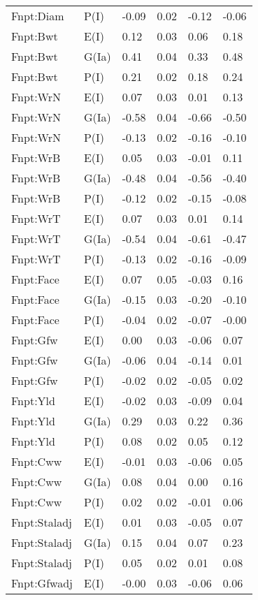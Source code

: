 \begin{center}
\begin{longtable}{|p{1.1in}|p{0.7in}|p{0.7in}|p{0.6in}|p{0.6in}|p{0.6in}|}
  Fnpt:Diam & P(I) & -0.09 & 0.02 & -0.12 & -0.06 \\ 
  Fnpt:Bwt & E(I) & 0.12 & 0.03 & 0.06 & 0.18 \\ 
  Fnpt:Bwt & G(Ia) & 0.41 & 0.04 & 0.33 & 0.48 \\ 
  Fnpt:Bwt & P(I) & 0.21 & 0.02 & 0.18 & 0.24 \\ 
  Fnpt:WrN & E(I) & 0.07 & 0.03 & 0.01 & 0.13 \\ 
  Fnpt:WrN & G(Ia) & -0.58 & 0.04 & -0.66 & -0.50 \\ 
  Fnpt:WrN & P(I) & -0.13 & 0.02 & -0.16 & -0.10 \\ 
  Fnpt:WrB & E(I) & 0.05 & 0.03 & -0.01 & 0.11 \\ 
  Fnpt:WrB & G(Ia) & -0.48 & 0.04 & -0.56 & -0.40 \\ 
  Fnpt:WrB & P(I) & -0.12 & 0.02 & -0.15 & -0.08 \\ 
  Fnpt:WrT & E(I) & 0.07 & 0.03 & 0.01 & 0.14 \\ 
  Fnpt:WrT & G(Ia) & -0.54 & 0.04 & -0.61 & -0.47 \\ 
  Fnpt:WrT & P(I) & -0.13 & 0.02 & -0.16 & -0.09 \\ 
  Fnpt:Face & E(I) & 0.07 & 0.05 & -0.03 & 0.16 \\ 
  Fnpt:Face & G(Ia) & -0.15 & 0.03 & -0.20 & -0.10 \\ 
  Fnpt:Face & P(I) & -0.04 & 0.02 & -0.07 & -0.00 \\ 
  Fnpt:Gfw & E(I) & 0.00 & 0.03 & -0.06 & 0.07 \\ 
  Fnpt:Gfw & G(Ia) & -0.06 & 0.04 & -0.14 & 0.01 \\ 
  Fnpt:Gfw & P(I) & -0.02 & 0.02 & -0.05 & 0.02 \\ 
  Fnpt:Yld & E(I) & -0.02 & 0.03 & -0.09 & 0.04 \\ 
  Fnpt:Yld & G(Ia) & 0.29 & 0.03 & 0.22 & 0.36 \\ 
  Fnpt:Yld & P(I) & 0.08 & 0.02 & 0.05 & 0.12 \\ 
  Fnpt:Cww & E(I) & -0.01 & 0.03 & -0.06 & 0.05 \\ 
  Fnpt:Cww & G(Ia) & 0.08 & 0.04 & 0.00 & 0.16 \\ 
  Fnpt:Cww & P(I) & 0.02 & 0.02 & -0.01 & 0.06 \\ 
  Fnpt:Staladj & E(I) & 0.01 & 0.03 & -0.05 & 0.07 \\ 
  Fnpt:Staladj & G(Ia) & 0.15 & 0.04 & 0.07 & 0.23 \\ 
  Fnpt:Staladj & P(I) & 0.05 & 0.02 & 0.01 & 0.08 \\ 
  Fnpt:Gfwadj & E(I) & -0.00 & 0.03 & -0.06 & 0.06 \\ 

\end{longtable}
\end{center}
